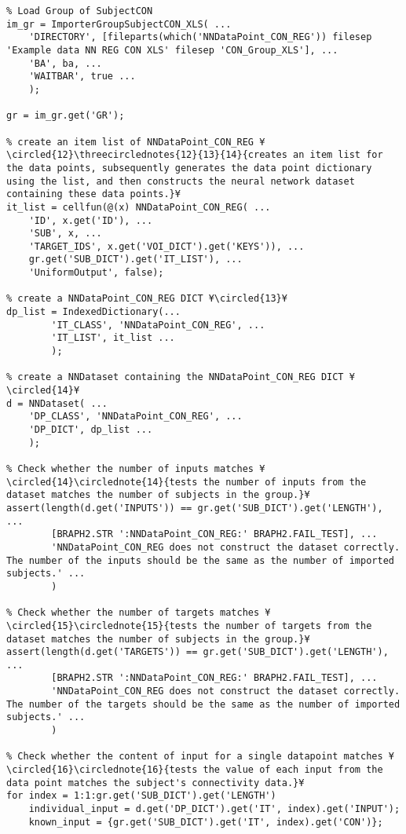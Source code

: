 \documentclass{tufte-handout}
\begin{document}
\begin{lstlisting}
% Load Group of SubjectCON
im_gr = ImporterGroupSubjectCON_XLS( ...
    'DIRECTORY', [fileparts(which('NNDataPoint_CON_REG')) filesep 'Example data NN REG CON XLS' filesep 'CON_Group_XLS'], ...
    'BA', ba, ...
    'WAITBAR', true ...
    );

gr = im_gr.get('GR');

% create an item list of NNDataPoint_CON_REG ¥\circled{12}\threecirclednotes{12}{13}{14}{creates an item list for the data points, subsequently generates the data point dictionary using the list, and then constructs the neural network dataset containing these data points.}¥
it_list = cellfun(@(x) NNDataPoint_CON_REG( ...
    'ID', x.get('ID'), ...
    'SUB', x, ...
    'TARGET_IDS', x.get('VOI_DICT').get('KEYS')), ...
    gr.get('SUB_DICT').get('IT_LIST'), ...
    'UniformOutput', false);

% create a NNDataPoint_CON_REG DICT ¥\circled{13}¥
dp_list = IndexedDictionary(...
        'IT_CLASS', 'NNDataPoint_CON_REG', ...
        'IT_LIST', it_list ...
        );

% create a NNDataset containing the NNDataPoint_CON_REG DICT ¥\circled{14}¥
d = NNDataset( ...
    'DP_CLASS', 'NNDataPoint_CON_REG', ...
    'DP_DICT', dp_list ...
    );

% Check whether the number of inputs matches ¥\circled{14}\circlednote{14}{tests the number of inputs from the dataset matches the number of subjects in the group.}¥
assert(length(d.get('INPUTS')) == gr.get('SUB_DICT').get('LENGTH'), ...
		[BRAPH2.STR ':NNDataPoint_CON_REG:' BRAPH2.FAIL_TEST], ...
		'NNDataPoint_CON_REG does not construct the dataset correctly. The number of the inputs should be the same as the number of imported subjects.' ...
		)

% Check whether the number of targets matches ¥\circled{15}\circlednote{15}{tests the number of targets from the dataset matches the number of subjects in the group.}¥
assert(length(d.get('TARGETS')) == gr.get('SUB_DICT').get('LENGTH'), ...
		[BRAPH2.STR ':NNDataPoint_CON_REG:' BRAPH2.FAIL_TEST], ...
		'NNDataPoint_CON_REG does not construct the dataset correctly. The number of the targets should be the same as the number of imported subjects.' ...
		)

% Check whether the content of input for a single datapoint matches ¥\circled{16}\circlednote{16}{tests the value of each input from the data point matches the subject's connectivity data.}¥
for index = 1:1:gr.get('SUB_DICT').get('LENGTH')
    individual_input = d.get('DP_DICT').get('IT', index).get('INPUT');
    known_input = {gr.get('SUB_DICT').get('IT', index).get('CON')};


\end{lstlisting}
\end{document}

